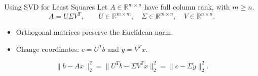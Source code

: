 \documentclass[10pt]{beamer}
\begin{document}
    
    
    
    

\begin{frame}{Using SVD for Least Squares}
Let $A\in\mathbb{R}^{m\times n}$ have full column rank, with $m\ge n$.
\[
A=U\Sigma V^T,
\qquad U\in\mathbb{R}^{m\times m},\quad
\Sigma\in\mathbb{R}^{m\times n},\quad V\in\mathbb{R}^{n\times n}.
\]
\begin{itemize}
\item Orthogonal matrices preserve the Euclidean norm.
\item Change coordinates: $c=U^Tb$ and $y=V^Tx$.
\end{itemize}
\[
\|b-Ax\|_2^2
=\|U^Tb-\Sigma V^Tx\|_2^2
=\|c-\Sigma y\|_2^2.
\]
\end{frame}
\end{document}
